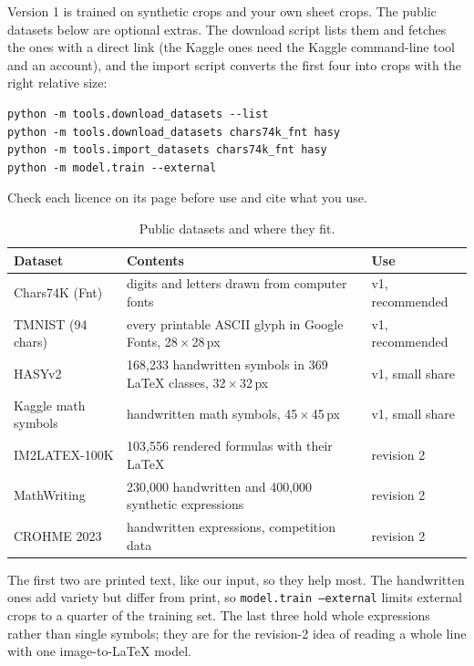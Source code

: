 \documentclass[11pt]{article}
\newcommand{\cmd}[1]{\texttt{#1}}
\begin{document}
Version 1 is trained on synthetic crops and your own sheet crops. The public datasets below are
optional extras. The download script lists them and fetches the ones with a direct link (the
Kaggle ones need the Kaggle command-line tool and an account), and the import script converts the
first four into crops with the right relative size:
\begin{lstlisting}
python -m tools.download_datasets --list
python -m tools.download_datasets chars74k_fnt hasy
python -m tools.import_datasets chars74k_fnt hasy
python -m model.train --external
\end{lstlisting}
Check each licence on its page before use and cite what you use.

\begin{table}[H]
\centering
\begin{tabular}{C{2.6cm}C{6.2cm}C{2.4cm}}
\toprule
\textbf{Dataset} & \textbf{Contents} & \textbf{Use} \\
\midrule
Chars74K (Fnt) & digits and letters drawn from computer fonts & v1, recommended \\
TMNIST (94 chars) & every printable ASCII glyph in Google Fonts, 28\,$\times$\,28\,px & v1, recommended \\
HASYv2 & 168{,}233 handwritten symbols in 369 \LaTeX{} classes, 32\,$\times$\,32\,px & v1, small share \\
Kaggle math symbols & handwritten math symbols, 45\,$\times$\,45\,px & v1, small share \\
IM2LATEX-100K & 103{,}556 rendered formulas with their \LaTeX{} & revision 2 \\
MathWriting & 230{,}000 handwritten and 400{,}000 synthetic expressions & revision 2 \\
CROHME 2023 & handwritten expressions, competition data & revision 2 \\
\bottomrule
\end{tabular}
\caption{Public datasets and where they fit.}
\end{table}

The first two are printed text, like our input, so they help most. The handwritten ones add
variety but differ from print, so \cmd{model.train --external} limits external crops to a quarter
of the training set. The last three hold whole expressions rather than single symbols; they are for
the revision-2 idea of reading a whole line with one image-to-\LaTeX{} model.
\end{document}
